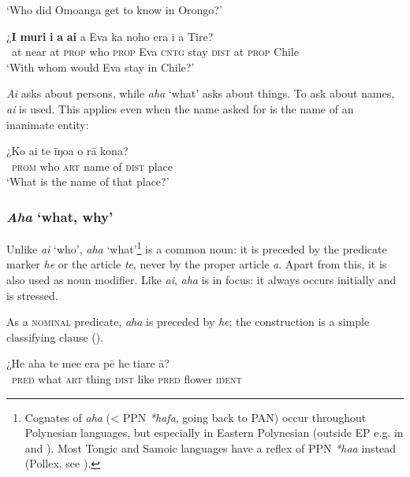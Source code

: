 \glt 
‘Who did Omoanga get to know in Orongo?’ \textstyleExampleref{[R616.017]} 
\z

\ea\label{ex:10.40}
\gll ¿\textbf{{\ꞌ}I} \textbf{muri} \textbf{i} \textbf{a} \textbf{ai} a Eva ka noho era {\ꞌ}i a Tire? \\
~at near at \textsc{prop} who \textsc{prop} Eva \textsc{cntg} stay \textsc{dist} at \textsc{prop} Chile \\

\glt 
‘With whom would Eva stay in Chile?’ \textstyleExampleref{[R615.660]} 
\z

\textit{Ai} asks about persons, while \textit{aha} ‘what’ asks about things. To ask about names, \textit{ai} is used. This applies even when the name asked for is the name of an inanimate entity:

\ea\label{ex:10.41}
\gll ¿Ko ai te {\ꞌ}īŋoa o rā kona? \\
~\textsc{prom} who \textsc{art} name of \textsc{dist} place \\

\glt 
‘What is the name of that place?’ \textstyleExampleref{[R124.014]}\textstyleExampleref{} 
\z
{}

\subsubsection{\textit{Aha} ‘what, why’}\label{sec:10.3.2.2}
Unlike \textit{ai} ‘who’, \textit{aha} ‘what’\footnote{\label{fn:489}Cognates of \textit{aha} ({\textless} PPN \textit{*hafa}, going back to PAN) occur throughout Polynesian languages, but especially in Eastern Polynesian (outside EP e.g. in  and ). Most Tongic and Samoic languages have a reflex of PPN \textit{*haa} instead (Pollex, see \citealt{GreenhillClark2011}).} is a common noun: it is preceded by the predicate marker \textit{he} or the article \textit{te}, never by the proper article \textit{a}. Apart from this, it is also used as noun modifier. Like \textit{ai}, \textit{aha} is in focus: it always occurs initially and is stressed. 

As a \textsc{nominal} predicate, \textit{aha} is preceded by \textit{he}; the construction is a simple classifying clause ().

\ea\label{ex:10.42}
\gll ¿He aha te me{\ꞌ}e era pē he tiare {\ꞌ}ā? \\
~\textsc{pred} what \textsc{art} thing \textsc{dist} like \textsc{pred} flower \textsc{ident} \\

